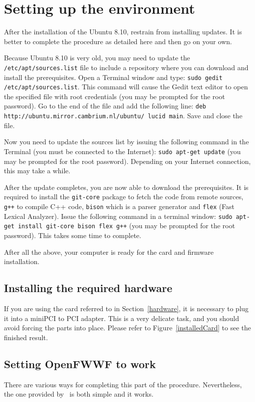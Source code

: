 \documentclass[conference]{IEEEtran}
\begin{document}
\section{Setting up the environment}
After the installation of the Ubuntu 8.10, restrain from installing updates. It is better to complete the procedure as detailed here and then go on your own.

Because Ubuntu 8.10 is very old, you may need to update the \texttt{/etc/apt/sources.list} file to include a repository where you can download and install the prerequisites. Open a Terminal window and type: \texttt{sudo gedit /etc/apt/sources.list}. This command will cause the Gedit text editor to open the specified file with root credentials (you may be prompted for the root password). Go to the end of the file and add the following line: \texttt{deb http://ubuntu.mirror.cambrium.nl/ubuntu/ lucid main}. Save and close the file.

Now you need to update the sources list by issuing the following command in the Terminal (you must be connected to the Internet): \texttt{sudo apt-get update} (you may be prompted for the root password). Depending on your Internet connection, this may take a while.

After the update completes, you are now able to download the prerequisites. It is required to install the \texttt{git-core} package to fetch the code from remote sources, \texttt{g++} to compile C++ code, \texttt{bison} which is a parser generator and \texttt{flex} (Fast Lexical Analyzer). Issue the following command in a terminal window: \texttt{sudo apt-get install git-core bison flex g++} (you may be prompted for the root password). This takes some time to complete.

After all the above, your computer is ready for the card and firmware installation.

\subsection{Installing the required hardware}

If you are using the card referred to in Section~\ref{hardware}, it is necessary to plug it into a miniPCI to PCI adapter. This is a very delicate task, and you should avoid forcing the parts into place. Please refer to Figure~\ref{installedCard} to see the finished result.

\subsection{Setting OpenFWWF to work}
There are various ways for completing this part of the procedure. Nevertheless, the one provided by~\cite{gnewsense} is both simple and it works.
\end{document}

